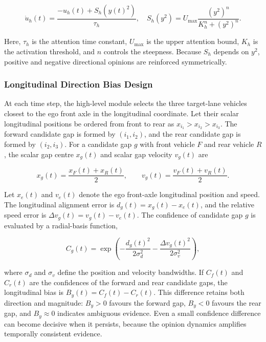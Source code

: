{\small
\begin{equation}
\dot{u}_h(t)=\frac{-u_h(t)+S_h(y(t)^2)}{\tau_h},\quad
S_h(y^2)=U_{\max}\frac{(y^2)^n}{K_h^n+(y^2)^n}.
\end{equation}
}

Here, \(\tau_h\) is the attention time constant, \(U_{\max}\) is the upper attention bound, \(K_h\) is the activation threshold, and \(n\) controls the steepness. Because \(S_h\) depends on \(y^2\), positive and negative directional opinions are reinforced symmetrically.

\subsubsection{Longitudinal Direction Bias Design}

At each time step, the high-level module selects the three target-lane vehicles closest to the ego front axle in the longitudinal coordinate. Let their scalar longitudinal positions be ordered from front to rear as \(x_{i_1}>x_{i_2}>x_{i_3}\). The forward candidate gap is formed by \((i_1,i_2)\), and the rear candidate gap is formed by \((i_2,i_3)\). For a candidate gap \(g\) with front vehicle \(F\) and rear vehicle \(R\), the scalar gap centre \(x_g(t)\) and scalar gap velocity \(v_g(t)\) are

{\small
\begin{equation}
x_g(t)=\frac{x_F(t)+x_R(t)}{2},\qquad
v_g(t)=\frac{v_F(t)+v_R(t)}{2}.
\end{equation}
}

Let \(x_e(t)\) and \(v_e(t)\) denote the ego front-axle longitudinal position and speed. The longitudinal alignment error is \(d_g(t)=x_g(t)-x_e(t)\), and the relative speed error is \(\Delta v_g(t)=v_g(t)-v_e(t)\). The confidence of candidate gap \(g\) is evaluated by a radial-basis function,

{\small
\begin{equation}
C_g(t)=
\exp\!\left(
-\frac{d_g(t)^2}{2\sigma_d^2}
-\frac{\Delta v_g(t)^2}{2\sigma_v^2}
\right),
\end{equation}
}

where \(\sigma_d\) and \(\sigma_v\) define the position and velocity bandwidths. If \(C_f(t)\) and \(C_r(t)\) are the confidences of the forward and rear candidate gaps, the longitudinal bias is \(B_y(t)=C_f(t)-C_r(t)\). This difference retains both direction and magnitude: \(B_y>0\) favours the forward gap, \(B_y<0\) favours the rear gap, and \(B_y\approx0\) indicates ambiguous evidence. Even a small confidence difference can become decisive when it persists, because the opinion dynamics amplifies temporally consistent evidence.

